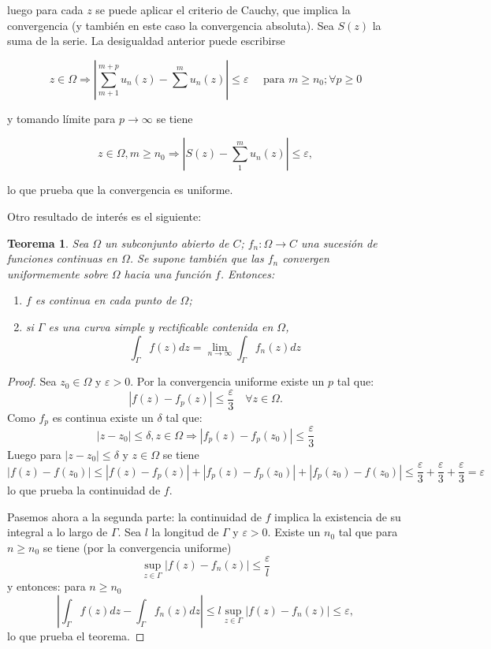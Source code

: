 \documentclass[10pt]{article}
\theoremstyle{plain}
\newtheorem{theorem}{Teorema}[section]
\theoremstyle{definition}
\theoremstyle{remark}
\begin{document}
luego para cada $z$ se puede aplicar el criterio de Cauchy, que implica la convergencia (y también en este caso la convergencia absoluta). Sea $S(z)$ la suma de la serie. La desigualdad anterior puede escribirse

$$
z \in \Omega \Rightarrow\left|\sum_{m+1}^{m+p} u_{n}(z)-\sum^{m} u_{n}(z)\right| \leqslant \varepsilon \quad \text { para } m \geqslant n_{0} ; \forall p \geqslant 0
$$

y tomando límite para $p \rightarrow \infty$ se tiene

$$
z \in \Omega, m \geqslant n_{0} \Rightarrow\left|S(z)-\sum_{1}^{m} u_{n}(z)\right| \leqslant \varepsilon,
$$

lo que prueba que la convergencia es uniforme.

Otro resultado de interés es el siguiente:

\begin{theorem}
Sea $\Omega$ un subconjunto abierto de $C$; $f_n: \Omega \rightarrow C$ una sucesión de funciones continuas en $\Omega$. Se supone también que las $f_n$ convergen uniformemente sobre $\Omega$ hacia una función $f$. Entonces:
\begin{enumerate}
\item[(a)] $f$ es continua en cada punto de $\Omega$;
\item[(b)] si $\Gamma$ es una curva simple y rectificable contenida en $\Omega$,
\begin{equation*}
\int_{\Gamma} f(z) d z=\lim _{n \rightarrow \infty} \int_{\Gamma} f_{n}(z) d z \tag{8-1}
\end{equation*}
\end{enumerate}
\end{theorem}

\begin{proof}
Sea $z_{0} \in \Omega$ y $\varepsilon>0$. Por la convergencia uniforme existe un $p$ tal que:
$$\left|f(z)-f_{p}(z)\right| \leqslant \frac{\varepsilon}{3} \quad \forall z \in \Omega .$$
Como $f_{p}$ es continua existe un $\delta$ tal que:
$$\left|z-z_{0}\right| \leqslant \delta, z \in \Omega \Rightarrow\left|f_{p}(z)-f_{p}\left(z_{0}\right)\right| \leqslant \frac{\varepsilon}{3}$$
Luego para $\left|z-z_{0}\right| \leqslant \delta$ y $z \in \Omega$ se tiene
$$\left|f(z)-f\left(z_{0}\right)\right| \leqslant\left|f(z)-f_{p}(z)\right|+\left|f_{p}(z)-f_{p}\left(z_{0}\right)\right|+\left|f_{p}\left(z_{0}\right)-f\left(z_{0}\right)\right| \leqslant \frac{\varepsilon}{3}+\frac{\varepsilon}{3}+\frac{\varepsilon}{3}=\varepsilon$$
lo que prueba la continuidad de $f$.

Pasemos ahora a la segunda parte: la continuidad de $f$ implica la existencia de su integral a lo largo de $\Gamma$.
Sea $l$ la longitud de $\Gamma$ y $\varepsilon>0$.
Existe un $n_{0}$ tal que para $n \geqslant n_{0}$ se tiene (por la convergencia uniforme)
$$\sup _{z \in \Gamma}\left|f(z)-f_{n}(z)\right| \leqslant \frac{\varepsilon}{l}$$
y entonces: para $n \geqslant n_{0}$
$$\left|\int_{\Gamma} f(z) d z-\int_{\Gamma} f_{n}(z) d z\right| \leqslant l \sup _{z \in \Gamma}\left|f(z)-f_{n}(z)\right| \leqslant \varepsilon,$$
lo que prueba el teorema.
\end{proof}
\end{document}
